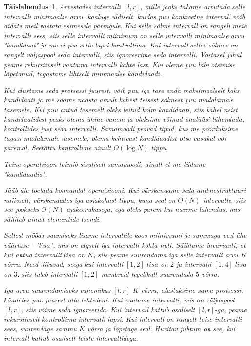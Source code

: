 \documentclass{trkut}
\newtheorem*{solution}{Täislahendus}
\begin{document}
\begin{solution}
Arvestades intervalli $[l,r]$, mille jaoks tahame arvutada selle intervalli minimaalse arvu, kaaluge üldiselt, kuidas puu konkreetne intervall võib aidata meil vastata esimesele päringule. Kui selle sõlme intervall on rangelt meie intervalli sees, siis selle intervalli miinimum on selle intervalli minimaalse arvu "kandidaat" ja me ei pea selle lapsi kontrollima. Kui intervall selles sõlmes on rangelt väljaspool seda intervalli, siis ignoreerime seda intervalli. Vastasel juhul peame rekursiivselt vaatama intervalli kahte last. Kui oleme puu läbi otsimise lõpetanud, tagastame lihtsalt minimaalse kandidaadi.

Kui alustame seda protsessi juurest, võib puu iga tase anda maksimaalselt kaks kandidaati ja me saame naasta ainult kahest teisest sõlmest puu madalamale tasemele. Kui puu antud tasemelt oleks leitud kolm kandidaati, siis kahel neist kandidaatidest peaks olema ühine vanem ja oleksime võinud analüüsi lühendada, kontrollides just seda intervalli. Samamoodi peavad tipud, kus me pöörduksime tagasi madalamale tasemele, olema kehtivast kandidaadist otse vasakul või paremal. Seetõttu kontrollime ainult $O(\log N)$ tippu.

Teine operatsioon toimib sisuliselt samamoodi, ainult et me liidame "kandidaadid".

Jääb üle toetada kolmandat operatsiooni. Kui värskendame seda andmestruktuuri naiivselt, värskendades iga asjakohast tippu, kuna seal on $O(N)$ intervalle, siis see jookseks $O(N)$ ajakeerukusega, ega oleks parem kui naiivne lahendus, mis säilitab ainult elementide loendi.

Sellest mööda saamiseks lisame intervallile koos miinimumi ja summaga veel ühe väärtuse - "$lisa$", mis on algselt iga intervalli kohta null. Säilitame invarianti, et kui antud intervalli $lisa$ on $K$, siis peame suurendama iga selle intervalli arvu $K$ võrra. Need liituvad, seega kui intervalli $[1,2]$ $lisa$ on $2$ ja intervalli $[1,4]$ $lisa$ on $3$, siis tuleb intervalli $[1,2]$ numbreid tegelikult suurendada $5$ võrra.

Iga arvu suurendamiseks vahemikus $[l,r]$ $K$ võrra, alustaksime sama protsessi, kõndides puu juurest alla lehtedeni. Kui vaatame intervalli, mis on väljaspool $[l,r]$, siis võime seda ignoreerida. Kui intervall kattub osaliselt $[l,r]$-ga, peame rekursiivselt kontrollima intervalli lapsi. Kui intervall on rangelt teise intervalli sees, suurendage sammu $K$ võrra ja lõpetage seal. 
Huvitav juhtum on see, kui intervall kattub osaliselt teiste intervallidega.


\end{solution}
\end{document}
